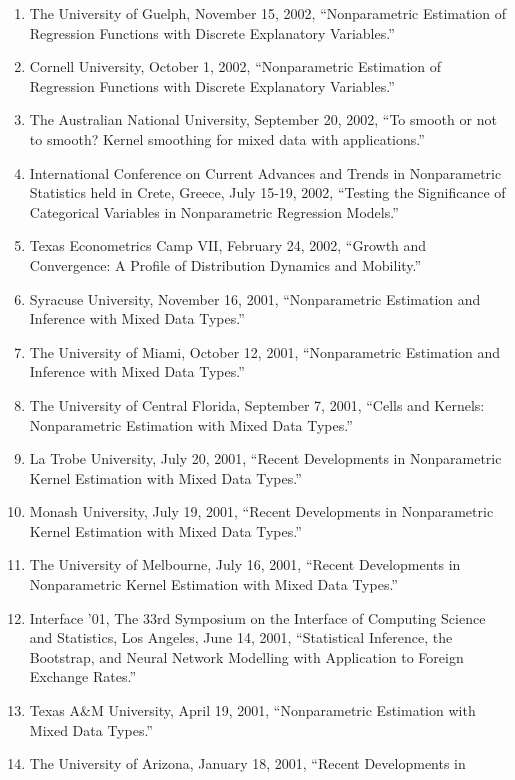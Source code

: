 \documentclass[
]{article}
\begin{document}
\begin{enumerate}
  Significance of Categorical Variables in Nonparametric Regression
  Models.''
\item
  The University of Guelph, November 15, 2002, ``Nonparametric
  Estimation of Regression Functions with Discrete Explanatory
  Variables.''
\item
  Cornell University, October 1, 2002, ``Nonparametric Estimation of
  Regression Functions with Discrete Explanatory Variables.''
\item
  The Australian National University, September 20, 2002, ``To smooth or
  not to smooth? Kernel smoothing for mixed data with applications.''
\item
  International Conference on Current Advances and Trends in
  Nonparametric Statistics held in Crete, Greece, July 15-19, 2002,
  ``Testing the Significance of Categorical Variables in Nonparametric
  Regression Models.''
\item
  Texas Econometrics Camp VII, February 24, 2002, ``Growth and
  Convergence: A Profile of Distribution Dynamics and Mobility.''
\item
  Syracuse University, November 16, 2001, ``Nonparametric Estimation and
  Inference with Mixed Data Types.''
\item
  The University of Miami, October 12, 2001, ``Nonparametric Estimation
  and Inference with Mixed Data Types.''
\item
  The University of Central Florida, September 7, 2001, ``Cells and
  Kernels: Nonparametric Estimation with Mixed Data Types.''
\item
  La Trobe University, July 20, 2001, ``Recent Developments in
  Nonparametric Kernel Estimation with Mixed Data Types.''
\item
  Monash University, July 19, 2001, ``Recent Developments in
  Nonparametric Kernel Estimation with Mixed Data Types.''
\item
  The University of Melbourne, July 16, 2001, ``Recent Developments in
  Nonparametric Kernel Estimation with Mixed Data Types.''
\item
  Interface '01, The 33rd Symposium on the Interface of Computing
  Science and Statistics, Los Angeles, June 14, 2001, ``Statistical
  Inference, the Bootstrap, and Neural Network Modelling with
  Application to Foreign Exchange Rates.''
\item
  Texas A\&M University, April 19, 2001, ``Nonparametric Estimation with
  Mixed Data Types.''
\item
  The University of Arizona, January 18, 2001, ``Recent Developments in

\end{enumerate}
\end{document}
